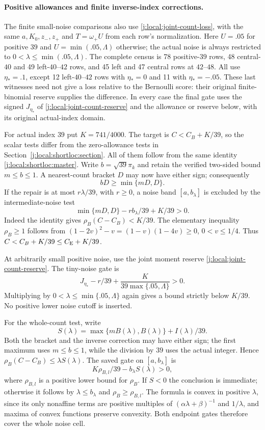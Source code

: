 \paragraph{Positive allowances and finite inverse-index corrections.}
\label{j:local:allowance}
The finite small-noise comparisons also use
\eqref{j:local:joint-count-loss}, with the same $a,K_0,z_-,z_+$ and
$T=\omega_+U$ from each row's normalization. Here $U=.05$ for positive
$39$ and $U=\min(.05,\Lambda)$ otherwise; the actual noise is always
restricted to $0<\lambda\le\min(.05,\Lambda)$.
The complete census is 78 positive-$39$ rows, 48 central-$40$ and
49 left-$40$--$42$ rows, and 45 left and 47 central rows at $42$--$48$.
All use $\eta_*=.1$, except 12 left-$40$--$42$ rows with $\eta_*=0$
and 11 with $\eta_*=-.05$. These last witnesses need not give a loss
relative to the Bernoulli score: their original finite-binomial reserve
supplies the difference. In every case the final gate uses the signed
$J_{\eta_*}$ of \eqref{j:local:joint-count-reserve} and the allowance
or reserve below, with its original actual-index domain.

For actual index $39$ put $K=741/4000$. The target is
$C< C_B+K/39$, so the scalar tests differ from
the zero-allowance tests in Section~\ref{j:local:shortloc:section}.
All of them follow from the same identity
\eqref{j:local:shortloc:master}. Write $b=\sqrt{39}\pi_k$ and retain
the verified two-sided bound $m\le b\le1$. A nearest-count
bracket $D$ may now have either sign; consequently
\[
 bD\ge\min\{mD,D\}.
\]
If the repair is at most $r\lambda/39$, with $r\ge0$, a noise
band $[a,b_\lambda]$ is excluded by the intermediate-noise test
\[
 \min\{mD,D\}-r b_\lambda/39+K/39>0.
\]
Indeed the identity gives $\rho_B(C-C_B)<K/39$.
The elementary inequality $\rho_B\ge1$ follows from
$(1-2v)^2-v=(1-v)(1-4v)\ge0$, $0<v\le1/4$.
Thus $C<C_B+K/39\le C_{\mathrm E}+K/39$.

At arbitrarily small positive noise, use the joint moment reserve
\eqref{j:local:joint-count-reserve}. The tiny-noise gate is
\[
       J_{\eta_*}-r/39+\frac{K}{39\max\{.05,\Lambda\}}>0.
\]
Multiplying by
$0<\lambda\le\min\{.05,\Lambda\}$ again gives a bound
strictly below $K/39$. No positive lower noise cutoff is inserted.

For the whole-count test, write
\[
 S(\lambda)=\max\{mB(\lambda),B(\lambda)\}
                         +I(\lambda)/39.
\]
Both the bracket and the inverse correction may have either sign;
the first maximum uses $m\le b\le1$, while the division by $39$
uses the actual integer. Hence
$\rho_B(C-C_B)\le\lambda S(\lambda)$.
The saved gate on $[a,b_\lambda]$ is
\[
        K\rho_{B,l}/39-b_\lambda S(\lambda)>0,
\]
where $\rho_{B,l}$ is a positive lower bound for $\rho_B$.
If $S<0$ the conclusion is immediate; otherwise it follows by
$\lambda\le b_\lambda$ and $\rho_B\ge\rho_{B,l}$.
The formula is convex in positive $\lambda$, since its only
nonaffine terms are positive multiples of
$(\alpha\lambda+\beta)^{-1}$ and $1/\lambda$, and maxima of
convex functions preserve convexity. Both endpoint gates therefore
cover the whole noise cell.



